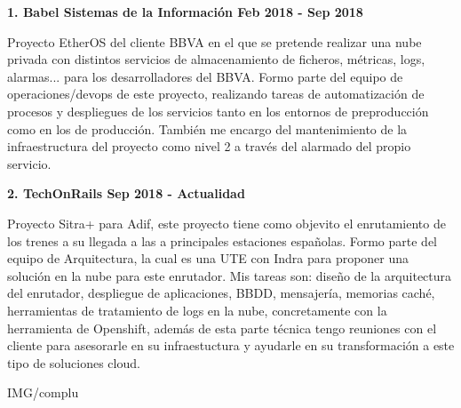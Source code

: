 \documentclass[paper=a4,fontsize=10pt]{temp} %
\newcommand\tab[1][1cm]{\hspace*{#1}}
\begin{document}
\textbf{{1. Babel Sistemas de la Información }{Feb 2018 - Sep 2018}\hspace{10pt}{Sysadmin/Devops}}

\tab Proyecto EtherOS del cliente BBVA en el que se pretende realizar una nube privada con distintos servicios de almacenamiento de ficheros, métricas, logs, alarmas... para los desarrolladores del BBVA. Formo parte del equipo de operaciones/devops de este proyecto, realizando tareas de automatización de procesos y despliegues de los servicios tanto en los entornos de preproducción como en los de producción. También me encargo del mantenimiento de la infraestructura del proyecto como nivel 2 a través del alarmado del propio servicio.
\sepspace

\textbf{{2. TechOnRails }{Sep 2018 - Actualidad}\hspace{10pt}{DevOps/Solution Architect}}

\tab Proyecto Sitra+ para Adif, este proyecto tiene como objevito el enrutamiento de los trenes a su llegada a las a principales estaciones españolas. Formo parte del equipo de Arquitectura, la cual es una UTE con Indra para proponer una solución en la nube para este enrutador. Mis tareas son: diseño de la arquitectura del enrutador, despliegue de aplicaciones, BBDD, mensajería, memorias caché, herramientas de tratamiento de logs en la nube, concretamente con la herramienta de Openshift, además de esta parte técnica tengo reuniones con el cliente para asesorarle en su infraestuctura y ayudarle en su transformación a este tipo de soluciones cloud.




\noindent

{IMG/complu}

\sepspace


\sepspace
\end{document}
